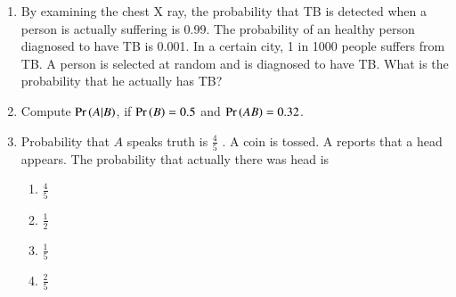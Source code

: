 \begin{enumerate}[label=\thesubsection.\arabic*,ref=\thesubsection.\theenumi]
%
\item By examining the chest X ray, the probability that TB is detected when a person
is actually suffering is 0.99. The probability of an healthy person diagnosed to 
have TB is 0.001. In a certain city, 1 in 1000 people suffers from TB. A person
is selected at random and is diagnosed to have TB. What is the probability that
he actually has TB? \\
%
	\item Compute $\Pr\left(A|B\right)$, if $\Pr\left(B\right)=0.5$ and $\Pr\left(AB\right)=0.32$. 
	\item Probability that $A$ speaks truth is
$\frac{4}{5}$ . A coin is tossed. A reports that a head
appears. The probability that actually there was head is
\begin{multicols}{4}
\begin{enumerate}
    \item $\frac{4}{5}$ 
\item $\frac{1}{2}$ 
\item $\frac{1}{5}$ 
\item $\frac{2}{5}$
\end{enumerate}
\end{multicols}
\end{enumerate}


